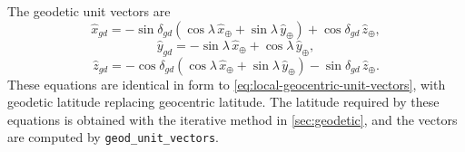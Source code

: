 The geodetic unit vectors are
\begin{equation}
  \hat{x}_{gd}
    = -\sin\delta_{gd}
       (\cos\lambda\,\hat{x}_{\oplus}
        +\sin\lambda\,\hat{y}_{\oplus})
       +\cos\delta_{gd}\,\hat{z}_{\oplus},
  \label{eq:local-geodetic-x-unit-vector}
\end{equation}
\begin{equation}
  \hat{y}_{gd}
    = -\sin\lambda\,\hat{x}_{\oplus}
      +\cos\lambda\,\hat{y}_{\oplus},
  \label{eq:local-geodetic-y-unit-vector}
\end{equation}
\begin{equation}
  \hat{z}_{gd}
    = -\cos\delta_{gd}
       (\cos\lambda\,\hat{x}_{\oplus}
        +\sin\lambda\,\hat{y}_{\oplus})
      -\sin\delta_{gd}\,\hat{z}_{\oplus}.
  \label{eq:local-geodetic-z-unit-vector}
\end{equation}
These equations are identical in form to
\cref{eq:local-geocentric-unit-vectors}, with geodetic latitude replacing
geocentric latitude. The latitude required by these equations is obtained with the
iterative method in \cref{sec:geodetic}, and the vectors are computed by
\texttt{geod\_unit\_vectors}.
